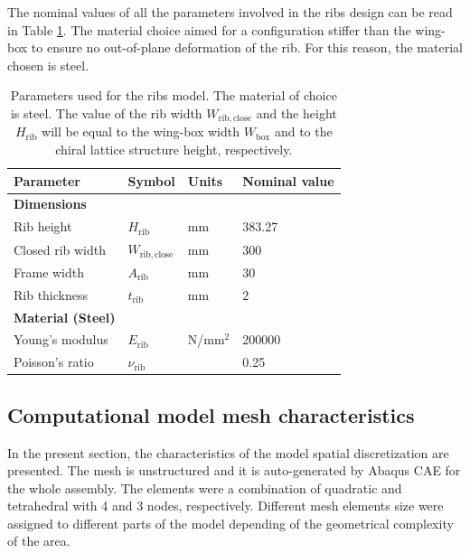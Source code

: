     The nominal values of all the parameters involved in the ribs design can be read in Table \ref{tab:parameters_rib}. The material choice aimed for a configuration stiffer than the wing-box to ensure no out-of-plane deformation of the rib. For this reason, the material chosen is steel.

    \begin{table}[!htpb]
    \centering
    \begin{tabular}{|l|lll|}
    \hline
    \textbf{Parameter} & \multicolumn{1}{l|}{\textbf{Symbol}} & \multicolumn{1}{l|}{\textbf{Units}} & \textbf{Nominal value} \\ \hline \hline
    {\textbf{Dimensions}} &  &  &  \\ \hline
    Rib height & \multicolumn{1}{l|}{$H_{\mathrm{rib}}$} & \multicolumn{1}{l|}{mm} & 383.27 \\ \hline
    Closed rib width & \multicolumn{1}{l|}{$W_{\mathrm{rib,close}}$} & \multicolumn{1}{l|}{mm} & 300 \\ \hline
    Frame width & \multicolumn{1}{l|}{$A_{\mathrm{rib}}$} & \multicolumn{1}{l|}{mm} & 30 \\ \hline
    Rib thickness & \multicolumn{1}{l|}{$t_{\mathrm{rib}}$} & \multicolumn{1}{l|}{mm} & 2 \\ \hline \hline
    {\textbf{Material (Steel)}} &  &  &  \\ \hline
    Young's modulus & \multicolumn{1}{l|}{$E_{\mathrm{rib}}$} & \multicolumn{1}{l|}{N/mm$^2$} & 200000 \\ \hline
    Poisson's ratio & \multicolumn{1}{l|}{$\nu_{\mathrm{rib}}$} & \multicolumn{1}{l|}{} & 0.25 \\ \hline
    \end{tabular}
    \caption[Parameters used for the ribs model]{Parameters used for the ribs model. The material of choice is steel. The value of the rib width $W_{\mathrm{rib,close}}$ and the height $H_{\mathrm{rib}}$ will be equal to the wing-box width $W_{\mathrm{box}}$ and to the chiral lattice structure height, respectively.}
    \label{tab:parameters_rib}
    \end{table}

  \clearpage
  \subsection{Computational model mesh characteristics} \label{subsec:mesh_computationalModel}

    In the present section, the characteristics of the model spatial discretization are presented. The mesh is unstructured and it is auto-generated by Abaqus CAE for the whole assembly. The elements were a combination of quadratic and tetrahedral with 4 and 3 nodes, respectively. Different mesh elements size were assigned to different parts of the model depending of the geometrical complexity of the area.

